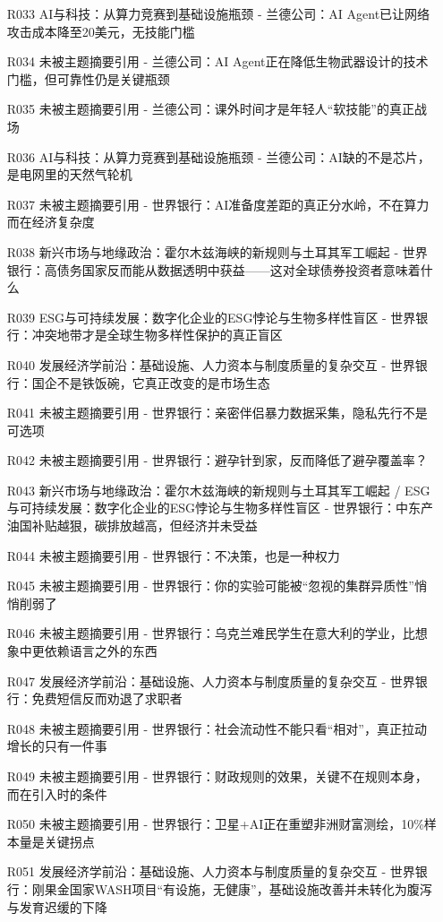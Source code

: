 \documentclass[11pt]{ctexart}
\begin{document}
\begin{itemize}
  \item [R033] AI与科技：从算力竞赛到基础设施瓶颈 - 兰德公司：AI Agent已让网络攻击成本降至20美元，无技能门槛
  \item [R034] 未被主题摘要引用 - 兰德公司：AI Agent正在降低生物武器设计的技术门槛，但可靠性仍是关键瓶颈
  \item [R035] 未被主题摘要引用 - 兰德公司：课外时间才是年轻人“软技能”的真正战场
  \item [R036] AI与科技：从算力竞赛到基础设施瓶颈 - 兰德公司：AI缺的不是芯片，是电网里的天然气轮机
  \item [R037] 未被主题摘要引用 - 世界银行：AI准备度差距的真正分水岭，不在算力而在经济复杂度
  \item [R038] 新兴市场与地缘政治：霍尔木兹海峡的新规则与土耳其军工崛起 - 世界银行：高债务国家反而能从数据透明中获益——这对全球债券投资者意味着什么
  \item [R039] ESG与可持续发展：数字化企业的ESG悖论与生物多样性盲区 - 世界银行：冲突地带才是全球生物多样性保护的真正盲区
  \item [R040] 发展经济学前沿：基础设施、人力资本与制度质量的复杂交互 - 世界银行：国企不是铁饭碗，它真正改变的是市场生态
  \item [R041] 未被主题摘要引用 - 世界银行：亲密伴侣暴力数据采集，隐私先行不是可选项
  \item [R042] 未被主题摘要引用 - 世界银行：避孕针到家，反而降低了避孕覆盖率？
  \item [R043] 新兴市场与地缘政治：霍尔木兹海峡的新规则与土耳其军工崛起 / ESG与可持续发展：数字化企业的ESG悖论与生物多样性盲区 - 世界银行：中东产油国补贴越狠，碳排放越高，但经济并未受益
  \item [R044] 未被主题摘要引用 - 世界银行：不决策，也是一种权力
  \item [R045] 未被主题摘要引用 - 世界银行：你的实验可能被“忽视的集群异质性”悄悄削弱了
  \item [R046] 未被主题摘要引用 - 世界银行：乌克兰难民学生在意大利的学业，比想象中更依赖语言之外的东西
  \item [R047] 发展经济学前沿：基础设施、人力资本与制度质量的复杂交互 - 世界银行：免费短信反而劝退了求职者
  \item [R048] 未被主题摘要引用 - 世界银行：社会流动性不能只看“相对”，真正拉动增长的只有一件事
  \item [R049] 未被主题摘要引用 - 世界银行：财政规则的效果，关键不在规则本身，而在引入时的条件
  \item [R050] 未被主题摘要引用 - 世界银行：卫星+AI正在重塑非洲财富测绘，10\%样本量是关键拐点
  \item [R051] 发展经济学前沿：基础设施、人力资本与制度质量的复杂交互 - 世界银行：刚果金国家WASH项目“有设施，无健康”，基础设施改善并未转化为腹泻与发育迟缓的下降

\end{itemize}
\end{document}
